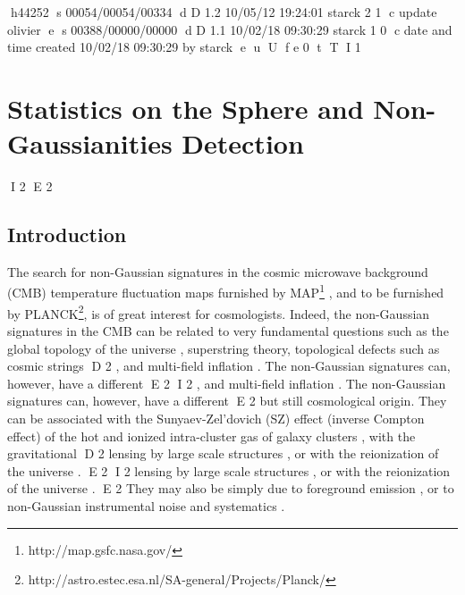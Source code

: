 h44252
s 00054/00054/00334
d D 1.2 10/05/12 19:24:01 starck 2 1
c update olivier
e
s 00388/00000/00000
d D 1.1 10/02/18 09:30:29 starck 1 0
c date and time created 10/02/18 09:30:29 by starck
e
u
U
f e 0
t
T
I 1
\chapter{Statistics on the Sphere and Non-Gaussianities Detection}
I 2
\label{ch_fluctu}
E 2
\section{Introduction}
The search for non-Gaussian signatures in the cosmic microwave background (CMB) temperature fluctuation maps furnished by
MAP\footnote{http://map.gsfc.nasa.gov/} \citep{komatsu2003}, and to be furnished by PLANCK\footnote{http://astro.estec.esa.nl/SA-general/Projects/Planck/},
is of great interest for cosmologists. Indeed, the non-Gaussian signatures in the CMB can be related to very fundamental questions
such as the global topology of the universe \citep{riazuelo2002}, superstring theory, topological defects such as cosmic strings
D 2
\citep{bouchet88}, and multi-field inflation \citep{bernardeau2002}. The non-Gaussian signatures can, however, have a different 
E 2
I 2
\citep{gauss:bouchet88}, and multi-field inflation \citep{bernardeau2002}. The non-Gaussian signatures can, however, have a different 
E 2
but still cosmological origin. They can be associated with the Sunyaev-Zel'dovich (SZ) effect \citep{sunyaev80} (inverse Compton
effect) of the hot and ionized intra-cluster gas of galaxy clusters \citep{gauss:aghanim99,cooray2001}, with the gravitational 
D 2
lensing by large scale structures \citep{bernardeau2003}, or with the reionization of the universe \citep{gauss:aghanim99,castro2002}. 
E 2
I 2
lensing by large scale structures \citep{threepoint:bernardeau03}, or with the reionization of the universe \citep{gauss:aghanim99,castro2002}. 
E 2
They may also be simply due to foreground emission \citep{gauss:jewell01}, or to non-Gaussian instrumental noise and systematics \citep{banday2000}.

